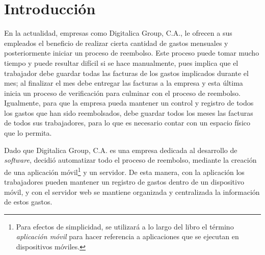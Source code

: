 \chapter*{Introducción} \label{sec:Introduccion}

\vspace{5 mm}
En la actualidad, empresas como Digitalica Group, C.A., le ofrecen a sus empleados el beneficio de realizar cierta cantidad de gastos mensuales y posteriormente iniciar un proceso de reembolso. Este proceso puede tomar mucho tiempo y puede resultar difícil si se hace manualmente, pues implica que el trabajador debe guardar todas las facturas de los gastos implicados durante el mes; al finalizar el mes debe entregar las facturas a la empresa y esta última inicia un proceso de verificación para culminar con el proceso de reembolso. Igualmente, para que la empresa pueda mantener un control y registro de todos los gastos que han sido reembolsados, debe guardar todos los meses las facturas de todos sus trabajadores, para lo que es necesario contar con un espacio físico que lo permita. 

Dado que Digitalica Group, C.A. es una empresa dedicada al desarrollo de \textit{software}, decidió automatizar todo el proceso de reembolso, mediante la creación de una aplicación móvil\footnote{Para efectos de simplicidad, se utilizará a lo largo del libro el término \textit{aplicación móvil} para hacer referencia a aplicaciones que se ejecutan en dispositivos móviles.} y un servidor. De esta manera, con la aplicación los trabajadores pueden mantener un registro de gastos dentro de un dispositivo móvil, y con el servidor web se mantiene organizada y centralizada la información de estos gastos.



